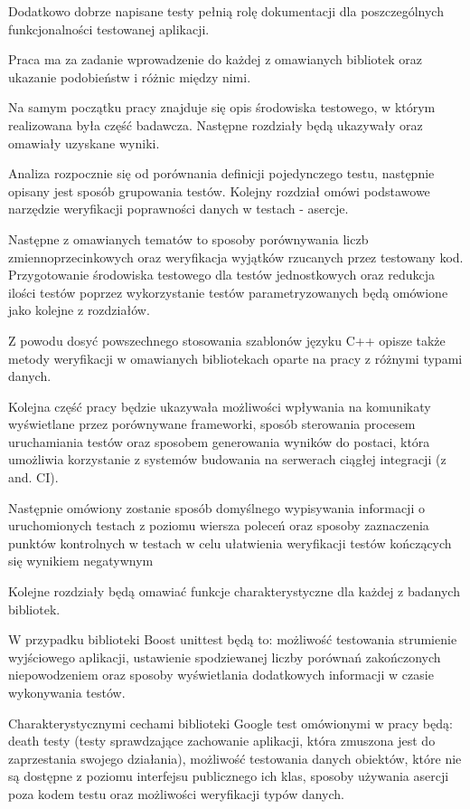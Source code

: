 \documentclass[12pt,a4paper,notitlepage]{report}
\begin{document}
Dodatkowo dobrze napisane testy pełnią rolę dokumentacji dla poszczególnych funkcjonalności testowanej aplikacji.

Praca ma za zadanie wprowadzenie do każdej z omawianych bibliotek oraz ukazanie podobieństw i różnic między nimi.

Na samym początku pracy znajduje się opis środowiska testowego, w którym realizowana była część badawcza. Następne rozdziały będą ukazywały oraz omawiały uzyskane wyniki.

Analiza rozpocznie się od porównania definicji pojedynczego testu, następnie opisany jest sposób grupowania testów. Kolejny rozdział omówi podstawowe narzędzie weryfikacji poprawności danych w testach - asercje.

Następne z omawianych tematów to sposoby porównywania liczb zmiennoprzecinkowych oraz weryfikacja wyjątków rzucanych przez testowany kod. Przygotowanie środowiska testowego dla testów jednostkowych oraz redukcja ilości testów poprzez wykorzystanie testów parametryzowanych będą omówione jako kolejne z rozdziałów.

Z powodu dosyć powszechnego stosowania szablonów języku C++ opisze także metody weryfikacji w omawianych bibliotekach oparte na pracy z różnymi typami danych.

Kolejna część pracy będzie ukazywała możliwości wpływania na komunikaty wyświetlane przez porównywane frameworki, sposób sterowania procesem uruchamiania testów oraz sposobem generowania wyników do postaci, która umożliwia korzystanie z systemów budowania na serwerach ciągłej integracji (z and. CI).

Następnie omówiony zostanie sposób domyślnego wypisywania informacji o uruchomionych testach z poziomu wiersza poleceń oraz sposoby zaznaczenia punktów kontrolnych w testach w celu ułatwienia weryfikacji testów kończących się wynikiem negatywnym

Kolejne rozdziały będą omawiać funkcje charakterystyczne dla każdej z badanych bibliotek.

W przypadku biblioteki Boost unittest będą to: możliwość testowania strumienie wyjściowego aplikacji, ustawienie spodziewanej liczby porównań zakończonych niepowodzeniem oraz sposoby wyświetlania dodatkowych informacji w czasie wykonywania testów.

Charakterystycznymi cechami biblioteki Google test omówionymi w pracy będą: death testy (testy sprawdzające zachowanie aplikacji, która zmuszona jest do zaprzestania swojego działania), możliwość testowania danych obiektów, które nie są dostępne z poziomu interfejsu publicznego ich klas, sposoby używania asercji poza kodem testu oraz możliwości weryfikacji typów danych.
\end{document}
